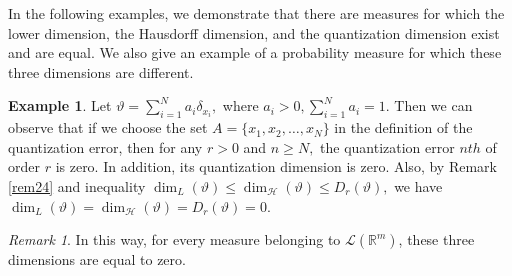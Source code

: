 \documentclass{amsproc}
\theoremstyle{definition}
\newtheorem{example}[theorem]{Example}
\theoremstyle{remark}
\newtheorem{remark}[theorem]{Remark}
\numberwithin{equation}{section}
\begin{document}
In the following examples, we demonstrate that there are measures for which the lower dimension, the Hausdorff dimension, and the quantization dimension exist and are equal. We also give an example of a probability measure for which these three dimensions are different.
\begin{example}
  Let $\vartheta = \sum_{i=1}^N a_i \delta_{x_i},$ where $a_i >0, \sum_{i=1}^N a_i = 1.$ Then we can observe that if we choose the set $A = \{x_1, x_2, \ldots, x_N\}$ in the definition of the quantization error, then for any $r>0$ and $n \ge N,$ the quantization error $nth$ of order $r$ is zero. In addition, its quantization dimension is zero. Also, by Remark \ref{rem24} and inequality $\dim_L(\vartheta) \le \dim_{\mathcal{H}}(\vartheta) \le D_r(\vartheta),$ we have $\dim_L(\vartheta) = \dim_{\mathcal{H}}(\vartheta) = D_r(\vartheta)=0.$
\end{example}
\begin{remark}
 In this way, for every measure belonging to $\mathcal{L}(\mathbb{R}^m)$, these three dimensions are equal to zero.   
\end{remark}
\end{document}
